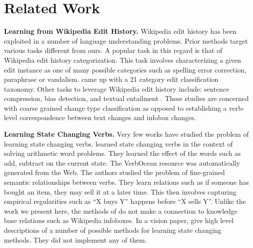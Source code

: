 \section{Related Work}

\textbf{Learning from Wikipedia Edit History.}
Wikipedia edit history has been exploited in a number
of language understanding problems.
Prior methods target various tasks different from ours.
  A popular task in this regard is that of
Wikipedia edit history categorization\cite{daxenberger2013automatically}.  This task
involves characterizing  a given edit instance as one of many possible categories 
such as spelling error correction, paraphrase or vandalism. 
\cite{DaxenbergerG12}  came up with a 21 category edit classification
taxonomy.  Other tasks to leverage Wikipedia edit history include: sentence compression, bias detection, and
 textual  entailment \cite{Nelken08miningwikipedia,Cahill13robustsystems,Zanzotto_expandingtextual,RecasensDJ13}.
These studies are concerned with coarse grained change type classification as opposed
to  establishing a verb-level  correspondence between text changes and  infobox changes.

\textbf{Learning State Changing Verbs.}
Very few works have studied the problem of learning state changing verbs.
\cite{HosseiniHEK14} learned state changing verbs in the context of solving arithmetic word problems.
They learned the effect of the words such as add, subtract on  the current state. 
The VerbOcean resource was automatically generated from the Web\cite{Chklovski04}. The authors  studied the problem of fine-grained semantic relationships between verbs. They learn relations such as  if someone has bought an item, they may sell it at a later time. This then involves capturing empirical regularities such as  ``X buys Y'' happens before ``X
sells Y''. Unlike the work we present here, the methods of \cite{Chklovski04,HosseiniHEK14}  do not make a connection to knowledge base relations such as Wikipedia infoboxes.
In a vision paper, \cite{Wijaya2014akbc} give high level descriptions of  a number of possible methods for learning state changing methods. They  did not implement any of them.
